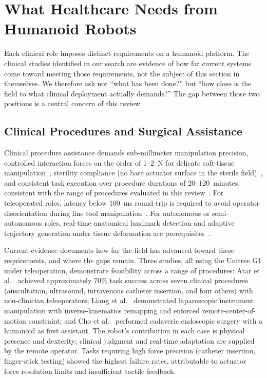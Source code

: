 ﻿%
\section{What Healthcare Needs from Humanoid Robots}
\label{sec:applications}

Each clinical role imposes distinct requirements on a humanoid platform. The
clinical studies identified in our search are evidence of how far current systems
come toward meeting those requirements, not the subject of this section in
themselves. We therefore ask not ``what has been done?'' but ``how close is the
field to what clinical deployment actually demands?'' The gap between those two
positions is a central concern of this review.

\subsection{Clinical Procedures and Surgical Assistance}
\label{sec:procedures}

Clinical procedure assistance demands sub-millimeter manipulation precision,
controlled interaction forces on the order of 1--2~N for delicate soft-tissue
manipulation~\cite{taylor2003medical,okamura2009haptic}, sterility compliance
(no bare actuator surface in the sterile field)~\cite{taylor2003medical}, and
consistent task execution over procedure durations of 20--120~minutes, 
consistent with the range of procedures evaluated in this  
review~\cite{atar2025humanoids,liang2025lapsurgie,cho2026humanoid}. For
teleoperated roles, latency below 100~ms round-trip is required to avoid  
operator disorientation during fine tool 
manipulation~\cite{lum2009latency,avgousti2016medical,motiwala2025telesurgery}. 
For autonomous or semi-autonomous roles, real-time anatomical landmark 
detection and adaptive trajectory generation under tissue deformation are 
prerequisites~\cite{yang2017medical,saeidi2022autonomous}.

Current evidence documents how far the field has advanced toward these
requirements, and where the gaps remain. Three studies, all using the Unitree
G1 under teleoperation, demonstrate feasibility across a range of procedures:
Atar et al.~\cite{atar2025humanoids} achieved approximately 70\% task success
across seven clinical procedures (auscultation, ultrasound, intravenous
catheter insertion, and four others) with non-clinician teleoperators; Liang et
al.~\cite{liang2025lapsurgie} demonstrated laparoscopic instrument manipulation
with inverse-kinematics remapping and enforced remote-center-of-motion
constraint; and Cho et al.~\cite{cho2026humanoid} performed cadaveric
endoscopic surgery with a humanoid as first assistant. The robot's contribution
in each case is physical presence and dexterity; clinical judgment and
real-time adaptation are supplied by the remote operator. Tasks requiring high
force precision (catheter insertion, finger-stick testing) showed the highest
failure rates, attributable to actuator force resolution limits and insufficient
tactile feedback.

